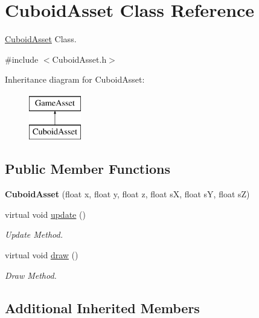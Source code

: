 \hypertarget{classCuboidAsset}{\section{Cuboid\-Asset Class Reference}
\label{classCuboidAsset}
}


\hyperlink{classCuboidAsset}{Cuboid\-Asset} Class.  




{\ttfamily \#include $<$Cuboid\-Asset.\-h$>$}

Inheritance diagram for Cuboid\-Asset\-:\begin{figure}[H]
\begin{center}
\leavevmode
\includegraphics[height=2.000000cm]{classCuboidAsset}
\end{center}
\end{figure}
\subsection*{Public Member Functions}
\begin{DoxyCompactItemize}
\item 
\hypertarget{classCuboidAsset_a05c45a76a82b779f130b0b5828d791c2}{{\bfseries Cuboid\-Asset} (float x, float y, float z, float s\-X, float s\-Y, float s\-Z)}\label{classCuboidAsset_a05c45a76a82b779f130b0b5828d791c2}

\item 
virtual void \hyperlink{classCuboidAsset_a840b611da0e48bafef023ff98d97cf5b}{update} ()
\begin{DoxyCompactList}\small\item\em Update Method. \end{DoxyCompactList}\item 
virtual void \hyperlink{classCuboidAsset_adf627dc1cad3cfe5a039d829b4ad2c32}{draw} ()
\begin{DoxyCompactList}\small\item\em Draw Method. \end{DoxyCompactList}\end{DoxyCompactItemize}
\subsection*{Additional Inherited Members}


